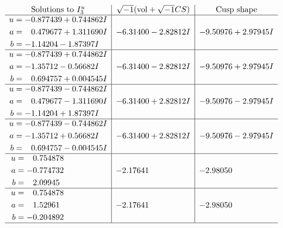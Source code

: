 \documentclass[1p]{elsarticle_modified}
\theoremstyle{definition}
\newcommand{\I}{\sqrt{-1}}
\begin{document}
$$\begin{array}{c|c|c}  
\text{Solutions to }I^u_{3}& \I (\text{vol} + \sqrt{-1}CS) & \text{Cusp shape}\\
 \hline 
\begin{aligned}
u &= -0.877439 + 0.744862 I \\
a &= \phantom{-}0.479677 + 1.311690 I \\
b &= -1.14204 - 1.87397 I\end{aligned}
 & -6.31400 - 2.82812 I & -9.50976 + 2.97945 I \\ \hline\begin{aligned}
u &= -0.877439 + 0.744862 I \\
a &= -1.35712 - 0.56682 I \\
b &= \phantom{-}0.694757 + 0.004545 I\end{aligned}
 & -6.31400 - 2.82812 I & -9.50976 + 2.97945 I \\ \hline\begin{aligned}
u &= -0.877439 - 0.744862 I \\
a &= \phantom{-}0.479677 - 1.311690 I \\
b &= -1.14204 + 1.87397 I\end{aligned}
 & -6.31400 + 2.82812 I & -9.50976 - 2.97945 I \\ \hline\begin{aligned}
u &= -0.877439 - 0.744862 I \\
a &= -1.35712 + 0.56682 I \\
b &= \phantom{-}0.694757 - 0.004545 I\end{aligned}
 & -6.31400 + 2.82812 I & -9.50976 - 2.97945 I \\ \hline\begin{aligned}
u &= \phantom{-}0.754878\phantom{ +0.000000I} \\
a &= -0.774732\phantom{ +0.000000I} \\
b &= \phantom{-}2.09945\phantom{ +0.000000I}\end{aligned}
 & -2.17641\phantom{ +0.000000I} & -2.98050\phantom{ +0.000000I} \\ \hline\begin{aligned}
u &= \phantom{-}0.754878\phantom{ +0.000000I} \\
a &= \phantom{-}1.52961\phantom{ +0.000000I} \\
b &= -0.204892\phantom{ +0.000000I}\end{aligned}
 & -2.17641\phantom{ +0.000000I} & -2.98050\phantom{ +0.000000I}\\
 \hline 
 \end{array}$$\newpage\newpage\renewcommand{\arraystretch}{1}
\end{document}
